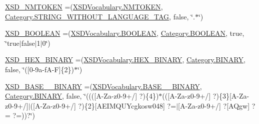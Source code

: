 \begin{DoxyCompactItemize}
\item 
\hyperlink{enumorg_1_1semanticweb_1_1owlapi_1_1vocab_1_1_o_w_l2_datatype_ae94a5cef993beeb1fd9a566c0ed07116}{X\-S\-D\-\_\-\-N\-M\-T\-O\-K\-E\-N} =(\hyperlink{enumorg_1_1semanticweb_1_1owlapi_1_1vocab_1_1_x_s_d_vocabulary_a9ec636a494a00d308f7b76985fba61f9}{X\-S\-D\-Vocabulary.\-N\-M\-T\-O\-K\-E\-N}, \hyperlink{enumorg_1_1semanticweb_1_1owlapi_1_1vocab_1_1_o_w_l2_datatype_1_1_category_a44f9e4681f05aa129189fc174186298a}{Category.\-S\-T\-R\-I\-N\-G\-\_\-\-W\-I\-T\-H\-O\-U\-T\-\_\-\-L\-A\-N\-G\-U\-A\-G\-E\-\_\-\-T\-A\-G}, false, \char`\"{}.$\ast$\char`\"{})
\item 
\hyperlink{enumorg_1_1semanticweb_1_1owlapi_1_1vocab_1_1_o_w_l2_datatype_afade6f87183f2d054776b4cb9ff94834}{X\-S\-D\-\_\-\-B\-O\-O\-L\-E\-A\-N} =(\hyperlink{enumorg_1_1semanticweb_1_1owlapi_1_1vocab_1_1_x_s_d_vocabulary_ae84ffc3484f4d2caabea9415578ceb34}{X\-S\-D\-Vocabulary.\-B\-O\-O\-L\-E\-A\-N}, \hyperlink{enumorg_1_1semanticweb_1_1owlapi_1_1vocab_1_1_o_w_l2_datatype_1_1_category_ac27b3937d6bdaeb8b7551629cb92a763}{Category.\-B\-O\-O\-L\-E\-A\-N}, true, \char`\"{}true$|$false$|$1$|$0\char`\"{})
\item 
\hyperlink{enumorg_1_1semanticweb_1_1owlapi_1_1vocab_1_1_o_w_l2_datatype_a4c5a160dc7019bc8fbcf5f47490887f2}{X\-S\-D\-\_\-\-H\-E\-X\-\_\-\-B\-I\-N\-A\-R\-Y} =(\hyperlink{enumorg_1_1semanticweb_1_1owlapi_1_1vocab_1_1_x_s_d_vocabulary_a73a9c3c35111dc94f8d096661a799def}{X\-S\-D\-Vocabulary.\-H\-E\-X\-\_\-\-B\-I\-N\-A\-R\-Y}, \hyperlink{enumorg_1_1semanticweb_1_1owlapi_1_1vocab_1_1_o_w_l2_datatype_1_1_category_a59bccb8d820aa1f7ab21c1ca3166f840}{Category.\-B\-I\-N\-A\-R\-Y}, false, \char`\"{}(\mbox{[}0-\/9a-\/f\-A-\/\-F\mbox{]}\{2\})$\ast$\char`\"{})
\item 
\hyperlink{enumorg_1_1semanticweb_1_1owlapi_1_1vocab_1_1_o_w_l2_datatype_a9bc966dcced3ee9dadf8118fa0569296}{X\-S\-D\-\_\-\-B\-A\-S\-E\-\_\-\_\-\-B\-I\-N\-A\-R\-Y} =(\hyperlink{enumorg_1_1semanticweb_1_1owlapi_1_1vocab_1_1_x_s_d_vocabulary_a79c331f40cb5e50b91df0739bfced257}{X\-S\-D\-Vocabulary.\-B\-A\-S\-E\-\_\-\_\-\-B\-I\-N\-A\-R\-Y}, \hyperlink{enumorg_1_1semanticweb_1_1owlapi_1_1vocab_1_1_o_w_l2_datatype_1_1_category_a59bccb8d820aa1f7ab21c1ca3166f840}{Category.\-B\-I\-N\-A\-R\-Y}, false, \char`\"{}(((\mbox{[}A-\/Za-\/z0-\/9+/\mbox{]} ?)\{4\})$\ast$((\mbox{[}A-\/Za-\/z0-\/9+/\mbox{]} ?)\{3\}\mbox{[}A-\/Za-\/z0-\/9+/\mbox{]}$|$(\mbox{[}A-\/Za-\/z0-\/9+/\mbox{]} ?)\{2\}\mbox{[}A\-E\-I\-M\-Q\-U\-Ycgkosw048\mbox{]} ?=$|$\mbox{[}A-\/Za-\/z0-\/9+/\mbox{]} ?\mbox{[}A\-Qgw\mbox{]} ?= ?=))?\char`\"{})

\end{DoxyCompactItemize}
